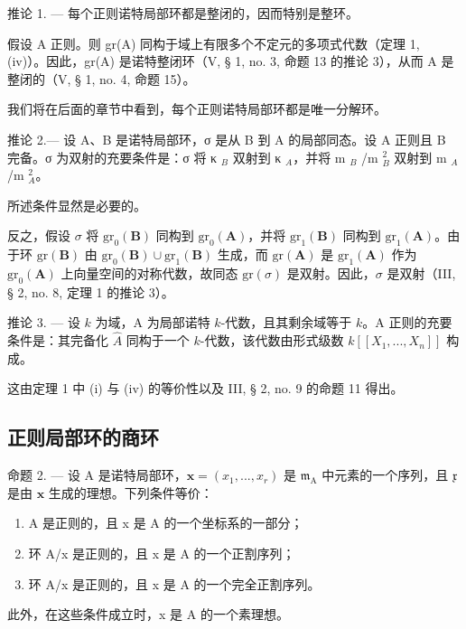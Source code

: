 推论 1. --- 每个正则诺特局部环都是整闭的，因而特别是整环。

假设 A 正则。则 gr(A) 同构于域上有限多个不定元的多项式代数（定理 1, (iv)）。因此，gr(A) 是诺特整闭环（V, § 1, no. 3, 命题 13 的推论 3），从而 A 是整闭的（V, § 1, no. 4, 命题 15）。

我们将在后面的章节中看到，每个正则诺特局部环都是唯一分解环。

推论 2.--- 设 A、B 是诺特局部环，σ 是从 B 到 A 的局部同态。设 A 正则且 B 完备。σ 为双射的充要条件是：σ 将 κ \(_{B}\) 双射到 κ \(_{A}\)，并将 m \(_{B}\) /m \(_{B}^{2}\) 双射到 m \(_{A}\) /m \(_{A}^{2}\)。

所述条件显然是必要的。

反之，假设 \(\sigma\) 将 \(\mathrm{gr}_{0}(\mathbf{B})\) 同构到 \(\mathrm{gr}_{0}(\mathbf{A})\)，并将 \(\mathrm{gr}_{1}(\mathbf{B})\) 同构到 \(\mathrm{gr}_{1}(\mathbf{A})\)。由于环 \(\mathrm{gr}(\mathbf{B})\) 由 \(\mathrm{gr}_{0}(\mathbf{B}) \cup \mathrm{gr}_{1}(\mathbf{B})\) 生成，而 \(\mathrm{gr}(\mathbf{A})\) 是 \(\mathrm{gr}_{1}(\mathbf{A})\) 作为 \(\mathrm{gr}_{0}(\mathbf{A})\) 上向量空间的对称代数，故同态 \(\mathrm{gr}(\sigma)\) 是双射。因此，\(\sigma\) 是双射（III, § 2, no. 8, 定理 1 的推论 3）。

推论 3. --- 设 \(k\) 为域，A 为局部诺特 \(k\)-代数，且其剩余域等于 \(k\)。A 正则的充要条件是：其完备化 \(\hat{A}\) 同构于一个 \(k\)-代数，该代数由形式级数 \(k[[X_1, ..., X_n]]\) 构成。

这由定理 1 中 (i) 与 (iv) 的等价性以及 III, § 2, no. 9 的命题 11 得出。

\subsection{正则局部环的商环}

命题 2. --- 设 A 是诺特局部环，\(\boldsymbol{x} = (x_1, ..., x_r)\) 是 \(\mathfrak{m}_{\mathrm{A}}\) 中元素的一个序列，且 \(\mathfrak{x}\) 是由 \(\boldsymbol{x}\) 生成的理想。下列条件等价：

\begin{enumerate}
\def\labelenumi{(\roman{enumi})}
\item
  A 是正则的，且 x 是 A 的一个坐标系的一部分；
\item
  环 A/x 是正则的，且 x 是 A 的一个正割序列；
\item
  环 A/x 是正则的，且 x 是 A 的一个完全正割序列。
\end{enumerate}

此外，在这些条件成立时，x 是 A 的一个素理想。


